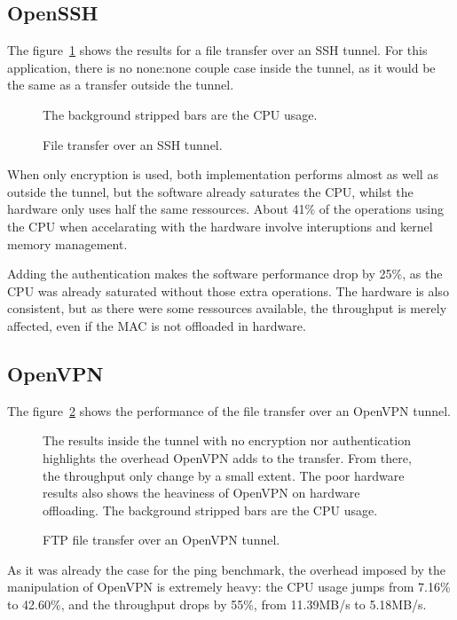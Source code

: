\subsection{OpenSSH}
The figure~\ref{fig:openssh-bench} shows the results for a file transfer over an SSH tunnel.
For this application, there is no none:none couple case inside the tunnel, as it would be the same as a transfer outside the tunnel.

\begin{figure}[ht]

\caption{File transfer over an SSH tunnel.}{The background stripped bars are the CPU usage.}
\label{fig:openssh-bench}
\end{figure}

When only encryption is used, both implementation performs almost as well as outside the tunnel, but the software already saturates the CPU, whilst the hardware only uses half the same ressources.
About 41\% of the operations using the CPU when accelarating with the hardware involve interuptions and kernel memory management.

Adding the authentication makes the software performance drop by 25\%, as the CPU was already saturated without those extra operations.
The hardware is also consistent, but as there were some ressources available, the throughput is merely affected, even if the MAC is not offloaded in hardware.



\subsection{OpenVPN}
The figure~\ref{fig:openvpn-ftp-bench} shows the performance of the file transfer over an OpenVPN tunnel.

\begin{figure}[ht]

\caption{FTP file transfer over an OpenVPN tunnel.}{The results inside the tunnel with no encryption nor authentication highlights the overhead OpenVPN adds to the transfer. From there, the throughput only change by a small extent. The poor hardware results also shows the heaviness of OpenVPN on hardware offloading. The background stripped bars are the CPU usage.}
\label{fig:openvpn-ftp-bench}
\end{figure}

As it was already the case for the ping benchmark, the overhead imposed by the manipulation of OpenVPN is extremely heavy: the CPU usage jumps from 7.16\% to 42.60\%, and the throughput drops by 55\%, from 11.39MB/s to 5.18MB/s.

